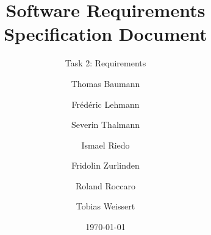\subject{Software Engineering and Design - Team Red}
\title{Software Requirements Specification Document}
\subtitle{Task 2: Requirements}
\author{
  Thomas Baumann
  \and
  Frédéric Lehmann
  \and
  Severin Thalmann
  \and
  Ismael Riedo
  \and
  Fridolin Zurlinden
  \and
  Roland Roccaro
  \and
  Tobias Weissert
}
\date{\today}

\maketitle
